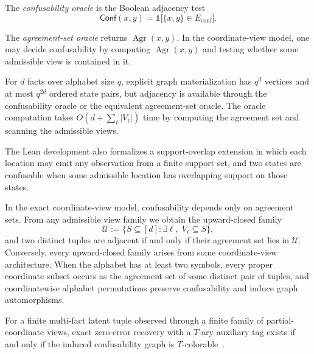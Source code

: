 \begin{definition}\label{def:confusability-oracle}
The \emph{confusability oracle} is the Boolean adjacency test
\[
\mathsf{Conf}(x,y)=\mathbf 1\big[\{x,y\}\in E_{\mathrm{conf}}\big].
\]
\end{definition}

\begin{definition}\label{def:agreement-set-oracle}
The \emph{agreement-set oracle} returns $\operatorname{Agr}(x,y)$. In the coordinate-view model, one may decide confusability by computing $\operatorname{Agr}(x,y)$ and testing whether some admissible view is contained in it.
\end{definition}

For $d$ facts over alphabet size $q$, explicit graph materialization has $q^d$ vertices and at most $q^{2d}$ ordered state pairs, but adjacency is available through the confusability oracle or the equivalent agreement-set oracle. The oracle computation takes $O(d + \sum_{\ell}|V_\ell|)$ time by computing the agreement set and scanning the admissible views.

The Lean development also formalizes a support-overlap extension in which each location may emit any observation from a finite support set, and two states are confusable when some admissible location has overlapping support on those states.

In the exact coordinate-view model, confusability depends only on agreement sets. From any admissible view family we obtain the upward-closed family
\[
\mathcal U := \{S \subseteq [d] : \exists \ell,\; V_\ell \subseteq S\},
\]
and two distinct tuples are adjacent if and only if their agreement set lies in $\mathcal U$. Conversely, every upward-closed family arises from some coordinate-view architecture. When the alphabet has at least two symbols, every proper coordinate subset occurs as the agreement set of some distinct pair of tuples, and coordinatewise alphabet permutations preserve confusability and induce graph automorphisms.

\begin{theorem}\label{thm:multifact-colorability}
For a finite multi-fact latent tuple observed through a finite family of partial-coordinate views, exact zero-error recovery with a $T$-ary auxiliary tag exists if and only if the induced confusability graph is $T$-colorable~\cite{west2001introduction,diestel2017graph}.
\end{theorem}

